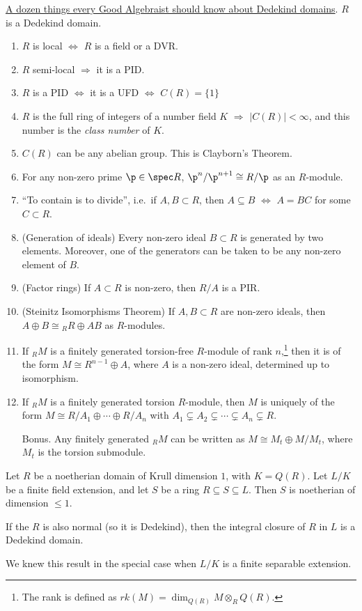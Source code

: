  \underline{A dozen things every Good Algebraist should know about Dedekind domains}. $R$
 is a Dedekind domain.
 \begin{enumerate}
   \item $R$ is local $\Longleftrightarrow$ $R$ is a field or a DVR.
   \item $R$ semi-local $\Longrightarrow$ it is a PID.
   \item $R$ is a PID $\Longleftrightarrow$ it is a UFD $\Longleftrightarrow$ $C(R)=\{1\}$
   \item $R$ is the full ring of integers of a number field $K$ $\Longrightarrow$ $|C(R)|<
   \infty$, and this number is the \emph{class number} of $K$.
   \item $C(R)$ can be any abelian group. This is Clayborn's Theorem.
   \item For any non-zero prime $\p\in \spec R$, $\p^n/\p^{n+1}\cong R/\p$ as an
   $R$-module.
   \item ``To contain is to divide'', i.e.~if $A,B\subset R$, then $A\subseteq B$
   $\Longleftrightarrow$ $A=BC$ for some $C\subset R$.
   \item (Generation of ideals) Every non-zero ideal $B\subset R$ is generated by two elements.
   Moreover, one of the generators can be taken to be any non-zero element of $B$.
   \item (Factor rings) If $A\subset R$ is non-zero, then $R/A$ is a PIR.
   \item (Steinitz Isomorphisms Theorem) If $A,B\subset R$ are non-zero ideals, then $A\oplus
   B\cong {}_RR\oplus AB$ as $R$-modules.
   \item If ${}_RM$ is a finitely generated torsion-free $R$-module of rank $n$,\footnote{The
   rank is defined as $rk(M)=\dim_{Q(R)} M\otimes_R Q(R)$.} then it is of the
   form $M\cong R^{n-1}\oplus A$, where $A$ is a non-zero ideal, determined up to
   isomorphism.
   \item If ${}_RM$ is a finitely generated torsion $R$-module, then $M$ is uniquely of the
   form $M\cong R/A_1\oplus
   \cdots \oplus R/A_n$ with $A_1\subsetneq A_2\subsetneq \cdots \subsetneq
   A_n\subsetneq R$.
   \item[Bonus.] Any finitely generated ${}_RM$ can be written as $M\cong M_t \oplus
   M/M_t$, where $M_t$ is the torsion submodule.
 \end{enumerate}

 \begin{theorem}
   Let $R$ be a noetherian domain of Krull dimension $1$, with $K=Q(R)$. Let $L/K$ be a
   finite field extension, and let $S$ be a ring $R\subseteq S\subseteq L$. Then $S$ is
   noetherian of dimension $\le 1$.
 \end{theorem}
 \begin{corollary}
   If the $R$ is also normal (so it is Dedekind), then the integral closure of $R$ in $L$
   is a Dedekind domain.
 \end{corollary}
 We knew this result in the special case when $L/K$ is a finite separable extension.

